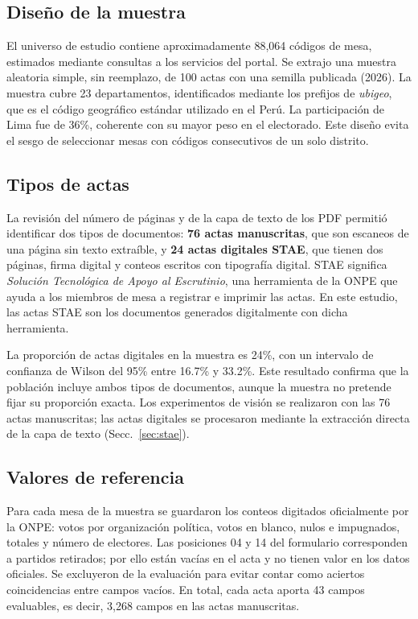 \documentclass[conference]{IEEEtran}
\begin{document}
\subsection{Dise\~no de la muestra}
El universo de estudio contiene aproximadamente 88,064 c\'odigos de mesa,
estimados mediante consultas a los servicios del portal. Se extrajo una muestra
aleatoria simple, sin reemplazo, de 100 actas con una semilla publicada (2026). La
muestra cubre 23 departamentos, identificados mediante los prefijos de
\emph{ubigeo}, que es el c\'odigo geogr\'afico est\'andar utilizado en el Per\'u.
La participaci\'on de Lima fue de 36\%, coherente con su mayor peso en el
electorado. Este dise\~no evita el sesgo de seleccionar mesas
con c\'odigos consecutivos de un solo distrito.

\subsection{Tipos de actas}
La revisi\'on del n\'umero de p\'aginas y de la capa de texto de los PDF permiti\'o
identificar dos tipos de documentos: \textbf{76 actas manuscritas}, que son
escaneos de una p\'agina sin texto extra\'ible, y \textbf{24 actas digitales
STAE}, que tienen dos p\'aginas, firma digital y conteos escritos con tipograf\'ia
digital. STAE significa \emph{Soluci\'on Tecnol\'ogica de Apoyo al Escrutinio},
una herramienta de la ONPE que ayuda a los miembros de mesa a registrar e
imprimir las actas. En este estudio, las actas STAE son los documentos
generados digitalmente con dicha herramienta.

La proporci\'on de actas digitales en la muestra es 24\%, con un intervalo de
confianza de Wilson del 95\% entre 16.7\% y 33.2\%. Este resultado confirma que
la poblaci\'on incluye ambos tipos de documentos, aunque la muestra no pretende
fijar su proporci\'on exacta. Los experimentos de visi\'on se realizaron con las
76 actas manuscritas; las actas digitales se procesaron mediante la extracci\'on
directa de la capa de texto (Secc.~\ref{sec:stae}).

\subsection{Valores de referencia}
Para cada mesa de la muestra se guardaron los conteos digitados oficialmente
por la ONPE: votos por organizaci\'on pol\'itica, votos en blanco, nulos e
impugnados, totales y n\'umero de electores. Las posiciones 04 y 14 del
formulario corresponden a partidos retirados; por ello est\'an vac\'ias en el
acta y no tienen valor en los datos oficiales. Se excluyeron de la evaluaci\'on
para evitar contar como aciertos coincidencias entre campos vac\'ios. En total,
cada acta aporta 43 campos evaluables, es decir, 3,268 campos en las actas
manuscritas.
\end{document}
